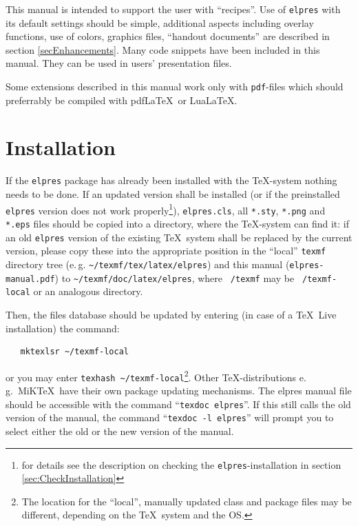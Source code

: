 \documentclass[11pt,a4paper]{article}
\begin{document}
This manual is intended to support the user with ``recipes''.  Use of
\texttt{elpres} with its default settings should be simple, additional aspects
including overlay functions, use of colors, graphics files, ``handout
documents'' are described in section \ref{secEnhancements}. Many code snippets
have been included in this manual.
They can be used in users' presentation files.

Some extensions described in this manual work only with \texttt{pdf}-files
which should preferrably be compiled with pdf\LaTeX\ or Lua\LaTeX.

\section{Installation}

\label{sec:installation}


\begin{sloppypar}

  If the \texttt{elpres} package has already been
  installed with the \TeX-system nothing needs to be done.  If an updated
  version shall be installed (or if the preinstalled \texttt{elpres} version
  does not work properly\footnote{for details see the description on checking the
    \texttt{elpres}-installation in section
    \ref{sec:CheckInstallation}}),
  \texttt{elpres.cls}, all \texttt{*.sty},
  \texttt{*.png} and \texttt{*.eps} files should be copied into a directory,
  where the \TeX-system can find it: if an old \texttt{elpres} version of the
  existing \TeX\ system shall be replaced by the current version, please copy
  these into the appropriate position in the ``local'' \texttt{texmf}
  directory tree (e.\,g. \verb+~/texmf/tex/latex/elpres+) and this manual
  (\texttt{elpres-manual.pdf}) to \verb+~/texmf/doc/latex/elpres+, where
  \texttt{~/texmf} may be \texttt{~/texmf-local} or an
  analogous directory.

Then, the files database should be updated by entering (in case of a \TeX~Live
installation) the command:

\end{sloppypar}

\begin{verbatim}
   mktexlsr ~/texmf-local
\end{verbatim}

or you may enter \verb+texhash ~/texmf-local+\footnote{The location
  for the ``local'', manually updated class and package files may be different,
  depending on the \TeX\ system and the OS.}.
Other \TeX-distributions e.\,g.\ MiK\TeX\ have
their own package updating mechanisms. The elpres manual file should be
accessible with the command ``\mbox{\texttt{texdoc elpres}}''. If this
still calls the old version of the manual, the command ``\texttt{texdoc -l elpres}''
will prompt you to select either the old or the new version of the manual.
\end{document}
